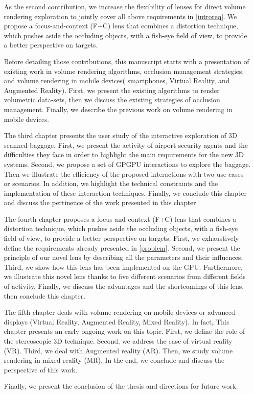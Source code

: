  As the second contribution, we increase the flexibility of lenses for direct volume rendering exploration to jointly cover all above requirements in \autoref{introreq}. We propose a focus-and-context (F+C) lens that combines a distortion technique, which pushes aside the occluding objects, with a fish-eye field of view, to provide a better perspective on targets.
 

Before detailing those contributions, this manuscript starts with a presentation of existing work in volume rendering algorithms, occlusion management strategies, and volume rendering in mobile devices( smartphones, Virtual Reality, and Augmented Reality). First, we present the existing algorithms to render volumetric data-sets, then we discuss the existing strategies of occlusion management. Finally, we describe the previous work on volume rendering in mobile devices.


The third chapter presents the user study of the interactive exploration of 3D scanned baggage. First, we present the activity of airport security agents and the difficulties they face in order to highlight the main requirements for the new 3D systems. Second, we propose a set of GPGPU interactions to explore the baggage. Then we illustrate the efficiency of the proposed interactions with two use cases or scenarios.
In addition, we highlight the technical constraints and the implementation of these interaction techniques. Finally, we conclude this chapter and discuss the pertinence of the work presented in this chapter.


The fourth chapter proposes a focus-and-context (F+C) lens that combines a distortion technique, which pushes aside the occluding objects, with a fish-eye field of view, to provide a better perspective on targets. First, we exhaustively define the requirements already presented in \autoref{problem}. Second, we present the principle of our novel lens by describing all the parameters and their influences. Third, we show how this lens has been implemented on the GPU. Furthermore, we illustrate this novel lens thanks to five different scenarios from different fields of activity. Finally, we discuss the advantages and the shortcomings of this lens, then conclude this chapter.  


The fifth chapter deals with volume rendering on mobile devices or advanced displays (Virtual Reality, Augmented Reality, Mixed Reality). In fact, This chapter presents an early ongoing work on this topic. First, we define the role of the stereoscopic 3D technique. Second, we address the case of virtual reality (VR). Third, we deal with Augmented reality (AR). Then, we study volume rendering in mixed reality (MR). In the end, we conclude and discuss the perspective of this work.


Finally, we present the conclusion of the thesis and directions for future work.


